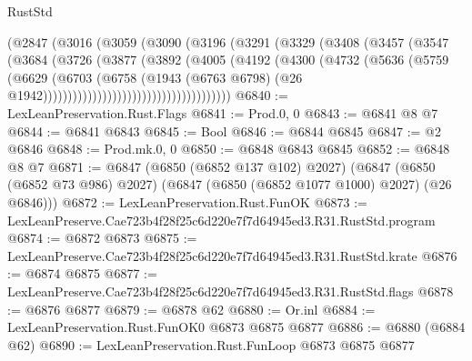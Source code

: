 \begin{lexlean}{RustStd}
\begin{coremodule}
                              (@2847
                                (@3016
                                  (@3059
                                    (@3090
                                      (@3196
                                        (@3291
                                          (@3329
                                            (@3408
                                              (@3457
                                                (@3547
                                                  (@3684
                                                    (@3726
                                                      (@3877
                                                        (@3892
                                                          (@4005
                                                            (@4192
                                                              (@4300
                                                                (@4732
                                                                  (@5636
                                                                    (@5759
                                                                      (@6629
                                                                        (@6703
                                                                          (@6758
                                                                            (@1943
                                                                              (@6763 @6798)
                                                                              (@26
                                                                                @1942))))))))))))))))))))))))))))))))))))))
@6840 := LexLeanPreservation.Rust.Flags
@6841 := Prod.{0, 0}
@6843 := @6841 @8 @7
@6844 := @6841 @6843
@6845 := Bool
@6846 := @6844 @6845
@6847 := @2 @6846
@6848 := Prod.mk.{0, 0}
@6850 := @6848 @6843 @6845
@6852 := @6848 @8 @7
@6871 := @6847
    (@6850 (@6852 @137 @102) @2027)
    (@6847 (@6850 (@6852 @73 @986) @2027) (@6847 (@6850 (@6852 @1077 @1000) @2027) (@26 @6846)))
@6872 := LexLeanPreservation.Rust.FunOK
@6873 := LexLeanPreserve.Cae723b4f28f25c6d220e7f7d64945ed3.R31.RustStd.program
@6874 := @6872 @6873
@6875 := LexLeanPreserve.Cae723b4f28f25c6d220e7f7d64945ed3.R31.RustStd.krate
@6876 := @6874 @6875
@6877 := LexLeanPreserve.Cae723b4f28f25c6d220e7f7d64945ed3.R31.RustStd.flags
@6878 := @6876 @6877
@6879 := @6878 @62
@6880 := Or.inl
@6884 := LexLeanPreservation.Rust.FunOK0 @6873 @6875 @6877
@6886 := @6880 (@6884 @62)
@6890 := LexLeanPreservation.Rust.FunLoop @6873 @6875 @6877

\end{coremodule}
\end{lexlean}
